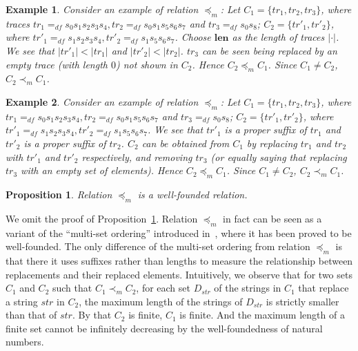 \documentclass[manuscript,screen]{acmart}
\newtheorem{prop}{Proposition}[section]
\newtheorem{example}{Example}[section]
\newcommand{\dddef}[0]{=_{df}}
\newcommand{\cnt}[0]{\mathit{C}}
\newcommand{\mult}[0]{\preceq_m}
\newcommand{\pmult}[0]{\prec_m}
\newcommand{\str}[0]{str}
\newcommand{\len}[0]{\textbf{len}}
\begin{document}

\begin{example}
Consider an example of relation $\mult$: 
Let $C_1=\{tr_1, tr_2, tr_3\}$, where traces $tr_1 \dddef s_0 s_1 s_2 s_3 s_4, tr_2 \dddef s_0 s_1s_5s_6s_7$ and $tr_3 \dddef s_0s_8$; 
$C_2 = \{tr'_1, tr'_2\}$, where 
$tr'_1 \dddef s_1 s_2 s_3 s_4, tr'_2 \dddef s_1 s_5s_6s_7$. 
Choose $\len$ as the length of traces $|\cdot|$.  
We see that $|tr'_1| < |tr_1|$ and $|tr'_2| < |tr_2|$. $tr_3$ can be seen being replaced by an empty trace (with length $0$) not shown in $C_2$.  
Hence $C_2\mult C_1$. 
Since $C_1\neq C_2$, $C_2\pmult C_1$. 
\end{example}
\fi

\ifx
\begin{example}
Consider an example of relation $\mult$: 
Let $C_1=\{tr_1, tr_2, tr_3\}$, where $tr_1 \dddef s_0 s_1 s_2 s_3 s_4, tr_2 \dddef s_0 s_1s_5s_6s_7$ and $tr_3 \dddef s_0s_8$; 
$C_2 = \{tr'_1, tr'_2\}$, where 
$tr'_1 \dddef s_1 s_2 s_3 s_4, tr'_2 \dddef s_1 s_5s_6s_7$. 
We see that $tr'_1$ is a proper suffix of $tr_1$ and $tr'_2$ is a proper suffix of $tr_2$. 
$C_2$ can be obtained from $C_1$ by replacing $tr_1$ and $tr_2$ with $tr'_1$ and $tr'_2$  respectively, and removing $tr_3$ (or equally saying that replacing $tr_3$ with an empty set of elements). 
Hence $C_2\mult C_1$. 
Since $C_1\neq C_2$, $C_2\pmult C_1$. 
\end{example}
\fi

\ifx
\begin{prop}
\label{prop:well-foundedness of relation pmult}
    Relation $\mult$ is a  well-founded relation. 
\end{prop}
We omit the proof of Proposition~\ref{prop:well-foundedness of relation pmult}.  
Relation $\mult$ in fact can be seen as a variant of the ``multi-set ordering'' introduced in~\cite{Dershowitz79}, where it has been proved to be well-founded. 
The only difference of the multi-set ordering from relation $\mult$ is that there it uses suffixes rather than lengths to measure the relationship between replacements and their replaced elements.
Intuitively, we observe that for two sets $\cnt_1$ and $\cnt_2$ such that $\cnt_1\pmult \cnt_2$, 
for each set $D_{\str}$ of the strings in $\cnt_1$ that replace a string $\str$ in $\cnt_2$, 
the maximum length of the strings of $D_{\str}$ is strictly smaller than that of $\str$. 
By that $\cnt_2$ is finite, $\cnt_1$ is finite. 
And the maximum length of a finite set cannot be infinitely decreasing by the well-foundedness of natural numbers.
\fi
\end{document}
